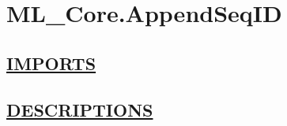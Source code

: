 \chapter*{ML\_Core.AppendSeqID}
\hypertarget{ecldoc:toc:ML_Core.AppendSeqID}{}

\section*{\underline{IMPORTS}}

\section*{\underline{DESCRIPTIONS}}
